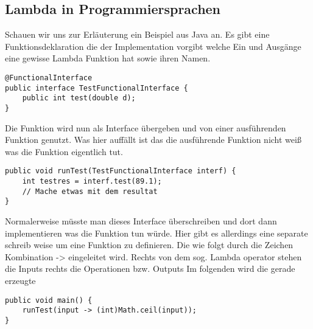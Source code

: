 \subsection{Lambda in Programmiersprachen}
Schauen wir uns zur Erläuterung ein Beispiel aus Java an.
Es gibt eine Funktionsdeklaration die der Implementation vorgibt welche Ein und Ausgänge
eine gewisse Lambda Funktion hat sowie ihren Namen.
\begin{verbatim}
@FunctionalInterface
public interface TestFunctionalInterface {
	public int test(double d);
}
\end{verbatim}
Die Funktion wird nun als Interface übergeben und von einer ausführenden Funktion genutzt.
Was hier auffällt ist das die ausführende Funktion nicht weiß was die Funktion eigentlich tut.
\begin{verbatim}
public void runTest(TestFunctionalInterface interf) {
	int testres = interf.test(89.1);
	// Mache etwas mit dem resultat
}
\end{verbatim}
Normalerweise müsste man dieses Interface überschreiben und dort dann implementieren was die Funktion tun würde. Hier gibt es allerdings eine separate schreib weise um eine Funktion zu definieren. Die wie folgt durch die Zeichen Kombination -> eingeleitet wird.
Rechts von dem sog. Lambda operator stehen die Inputs rechts die Operationen bzw. Outputs 
Im folgenden wird die gerade erzeugte
\begin{verbatim}
public void main() {
	runTest(input -> (int)Math.ceil(input));
}
\end{verbatim}

